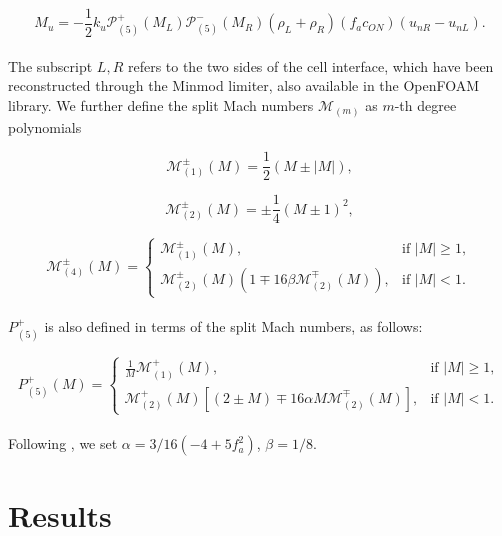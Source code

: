\documentclass[a5paper]{sapthesis}
\begin{document}
	\begin{equation}
		M_u = -\frac{1}{2} k_u \mathcal{P}_{(5)}^+ (M_L) \mathcal{P}_{(5)}^- (M_R) (\rho_L + \rho_R) (f_a c_{ON}) (u_{nR} - u_{nL}).
	\end{equation}
	\\
	The subscript $L, R$ refers to the two sides of the cell interface, which have been reconstructed through the Minmod limiter, also available in the OpenFOAM library. We further define the split Mach numbers $\mathcal{M}_{(m)}$ as $m$-th degree polynomials
	
	\begin{equation}
		\mathcal{M}_{(1)}^{\pm} (M) = \frac{1}{2} (M \pm |M|),
	\end{equation}
	
	\begin{equation}
		\mathcal{M}_{(2)}^{\pm} (M) = \pm \frac{1}{4} (M \pm 1)^2,
	\end{equation}
	
	\begin{equation}
		\mathcal{M}_{(4)}^{\pm} (M) =
		\begin{cases}
			\mathcal{M}_{(1)}^{\pm} (M), & \text{if } |M| \geq 1, \\
			\mathcal{M}_{(2)}^{\pm} (M) (1 \mp 16 \beta \mathcal{M}_{(2)}^{\mp} (M)), & \text{if } |M| < 1.
		\end{cases}
	\end{equation}
	\\
	$P_{(5)}^+$ is also defined in terms of the split Mach numbers, as follows:
	
	\begin{equation}
		P_{(5)}^+ (M) =
		\begin{cases}
			\frac{1}{M} \mathcal{M}_{(1)}^{+} (M), & \text{if } |M| \geq 1, \\
			\mathcal{M}_{(2)}^{+} (M) [(2 \pm M) \mp 16 \alpha M \mathcal{M}_{(2)}^{\mp} (M)], & \text{if } |M| < 1.
		\end{cases}
	\end{equation}
	\\
	Following \citet{LIOU_AUSM+-up}, we set $\alpha = 3/16(-4 + 5 f_a^2)$, $\beta = 1/8$.

	\chapter{Results}
	\label{chap:results}
	
\end{document}
